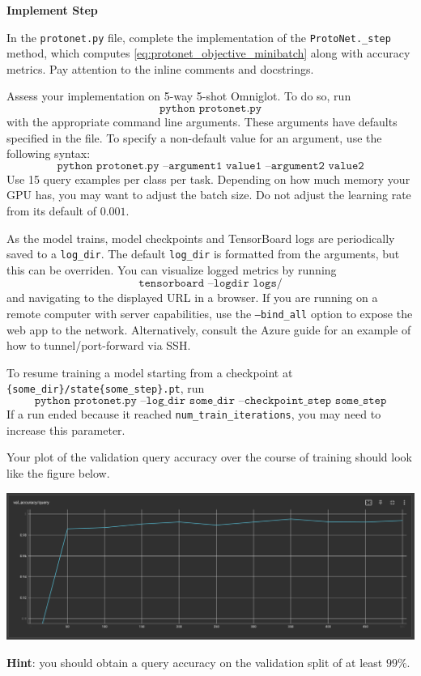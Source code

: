 \item {} {\bf Implement Step}

In the \texttt{protonet.py} file, complete the implementation of the \texttt{ProtoNet.\_step} method, which computes \eqref{eq:protonet_objective_minibatch} along with accuracy metrics. Pay attention to the inline comments and docstrings.
    
Assess your implementation on 5-way 5-shot Omniglot. To do so, run 
\begin{equation*} 
    \texttt{python protonet.py} 
\end{equation*}
with the appropriate command line arguments. These arguments have defaults specified in the file. To specify a non-default value for an argument, use the following syntax:
\begin{equation*}
    \texttt{python protonet.py --argument1 value1 --argument2 value2}
\end{equation*}
Use 15 query examples per class per task. Depending on how much memory your GPU has, you may want to adjust the batch size. Do not adjust the learning rate from its default of $0.001$.

    As the model trains, model checkpoints and TensorBoard logs are periodically saved to a \texttt{log\_dir}. The default \texttt{log\_dir} is formatted from the arguments, but this can be overriden. You can visualize logged metrics by running
\begin{equation*}
    \texttt{tensorboard --logdir logs/}
\end{equation*}
and navigating to the displayed URL in a browser. If you are running on a remote computer with server capabilities, use the \texttt{--bind\_all} option to expose the web app to the network. Alternatively, consult the Azure guide for an example of how to tunnel/port-forward via SSH.

To resume training a model starting from a checkpoint at \texttt{\{some\_dir\}/state\{some\_step\}.pt}, run
\begin{equation*}
    \texttt{python protonet.py --log\_dir some\_dir --checkpoint\_step some\_step}
\end{equation*}
If a run ended because it reached \texttt{num\_train\_iterations}, you may need to increase this parameter.

Your plot of the validation query accuracy over the course of training should look like the figure below.
\begin{center}
    \includegraphics[width=0.75\linewidth]{./figures/protonets_q2}
\end{center}

\textbf{Hint}: you should obtain a query accuracy on the validation split of at least $99\%$.